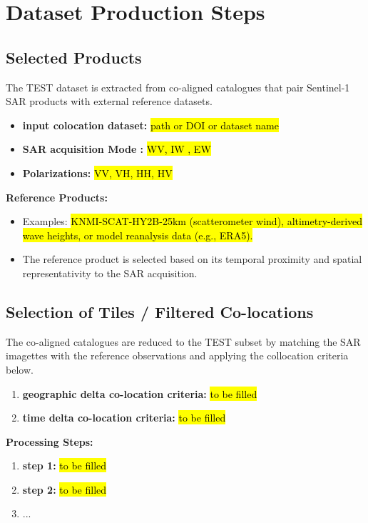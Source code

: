 \documentclass[11pt,a4paper]{article}
\begin{document}
\newpage
\section{Dataset Production Steps}

\subsection{Selected Products}
The TEST dataset is extracted from co-aligned catalogues that pair Sentinel-1 SAR products with external reference datasets. 

\begin{itemize}
    \item \textbf{input colocation dataset:} \hl{path or DOI or dataset name}
    \item \textbf{SAR acquisition Mode :} \hl{WV, IW , EW} 
    \item \textbf{Polarizations:} \hl{VV, VH, HH, HV }
\end{itemize}

\textbf{Reference Products:}
\begin{itemize}
    \item Examples: \hl{KNMI-SCAT-HY2B-25km (scatterometer wind), altimetry-derived wave heights, or model reanalysis data (e.g., ERA5).}
    \item The reference product is selected based on its temporal proximity and spatial representativity to the SAR acquisition.
\end{itemize}

\subsection{Selection of Tiles / Filtered Co-locations}
The co-aligned catalogues are reduced to the TEST subset by matching the SAR imagettes with the reference observations and applying the collocation criteria below. 
\begin{enumerate}
\item \textbf{geographic delta co-location criteria:}  \hl{to be filled}
\item \textbf{time delta co-location criteria:}  \hl{to be filled}
\end{enumerate}

\textbf{Processing Steps:}
\begin{enumerate}
    \item \textbf{step 1:} \hl{to be filled}
    \item \textbf{step 2:} \hl{to be filled}
    \item ...
\end{enumerate}
\end{document}
